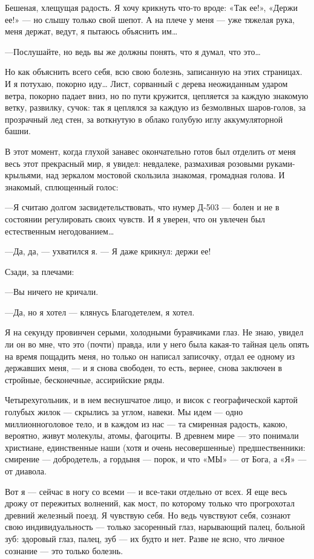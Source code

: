 \documentclass[11pt,openany]{book}
\begin{document}
Бешеная, хлещущая радость. Я хочу крикнуть что-то вроде: «Так ее!», «Держи ее!» --- но слышу только свой шепот. А на плече у меня --- уже тяжелая рука, меня держат, ведут, я пытаюсь объяснить им\ldots{}

---Послушайте, но ведь вы же должны понять, что я думал, что это\ldots{}

Но как объяснить всего себя, всю свою болезнь, записанную на этих страницах. И я потухаю, покорно иду\ldots{} Лист, сорванный с дерева неожиданным ударом ветра, покорно падает вниз, но по пути кружится, цепляется за каждую знакомую ветку, развилку, сучок: так я цеплялся за каждую из безмолвных шаров-голов, за прозрачный лед стен, за воткнутую в облако голубую иглу аккумуляторной башни.

В этот момент, когда глухой занавес окончательно готов был отделить от меня весь этот прекрасный мир, я увидел: невдалеке, размахивая розовыми руками-крыльями, над зеркалом мостовой скользила знакомая, громадная голова. И знакомый, сплющенный голос:

---Я считаю долгом засвидетельствовать, что нумер Д-503 --- болен и не в состоянии регулировать своих чувств. И я уверен, что он увлечен был естественным негодованием\ldots{}

---Да, да, --- ухватился я. --- Я даже крикнул: держи ее!

Сзади, за плечами:

---Вы ничего не кричали.

---Да, но я хотел --- клянусь Благодетелем, я хотел.

Я на секунду провинчен серыми, холодными буравчиками глаз. Не знаю, увидел ли он во мне, что это (почти) правда, или у него была какая-то тайная цель опять на время пощадить меня, но только он написал записочку, отдал ее одному из державших меня, --- и я снова свободен, то есть, вернее, снова заключен в стройные, бесконечные, ассирийские ряды.

Четырехугольник, и в нем веснушчатое лицо, и висок с географической картой голубых жилок --- скрылись за углом, навеки. Мы идем --- одно миллионноголовое тело, и в каждом из нас --- та смиренная радость, какою, вероятно, живут молекулы, атомы, фагоциты. В древнем мире --- это понимали христиане, единственные наши (хотя и очень несовершенные) предшественники: смирение --- добродетель, а гордыня --- порок, и что «МЫ» --- от Бога, а «Я» --- от диавола.

Вот я --- сейчас в ногу со всеми --- и все-таки отдельно от всех. Я еще весь дрожу от пережитых волнений, как мост, по которому только что прогрохотал древний железный поезд. Я чувствую себя. Но ведь чувствуют себя, сознают свою индивидуальность --- только засоренный глаз, нарывающий палец, больной зуб: здоровый глаз, палец, зуб --- их будто и нет. Разве не ясно, что личное сознание --- это только болезнь.
\end{document}
